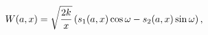 \[\mathop{W\/}\nolimits\!\left(a,x\right)=\sqrt{\frac{2k}{x}}\left(s_{1}(a,x)%
\mathop{\cos\/}\nolimits\omega-s_{2}(a,x)\mathop{\sin\/}\nolimits\omega\right),\]
